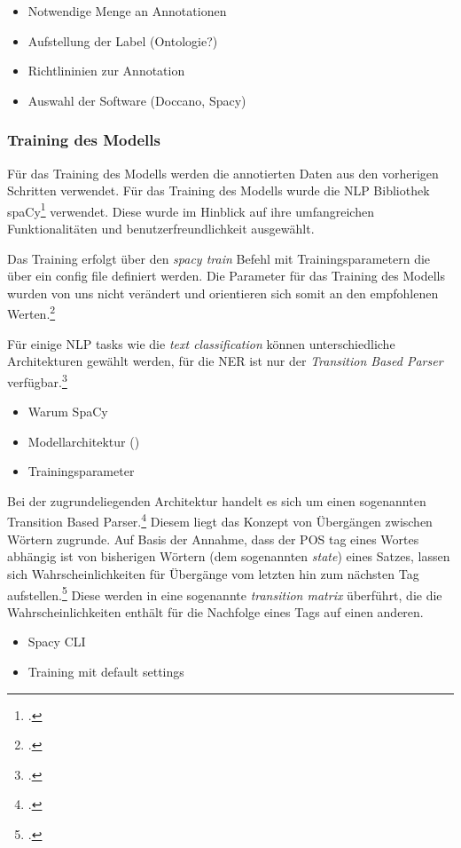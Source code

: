 
\begin{itemize}
    \item Notwendige Menge an Annotationen
    \item Aufstellung der Label (Ontologie?)
    \item Richtlininien zur Annotation
    \item Auswahl der Software (Doccano, Spacy)
\end{itemize}
\subsubsection{Training des Modells}
Für das Training des Modells werden die annotierten Daten aus den vorherigen Schritten verwendet.
Für das Training des Modells wurde die \acl{NLP} Bibliothek spaCy\footcite[]{spacy2} verwendet. Diese wurde im Hinblick auf ihre umfangreichen Funktionalitäten und benutzerfreundlichkeit ausgewählt.

Das Training erfolgt über den \textit{spacy train} Befehl mit Trainingsparametern die über ein config file definiert werden. Die Parameter für das Training des Modells wurden von uns nicht verändert und orientieren sich somit an den empfohlenen Werten.\footcite[vgl.]{ostkamp2021}%

Für einige \ac{NLP} tasks wie die \textit{text classification} können unterschiedliche Architekturen gewählt werden, für die \acl*{NER} ist nur der \textit{Transition Based Parser} verfügbar.\footcite{zotero-182}

\begin{itemize}
    \item Warum SpaCy
    \item Modellarchitektur ()
    \item Trainingsparameter
\end{itemize}


Bei der zugrundeliegenden Architektur handelt es sich um einen sogenannten Transition Based Parser.\footcite{zotero-182} Diesem liegt das Konzept von Übergängen zwischen Wörtern zugrunde. Auf Basis der Annahme, dass der \acl*{POS} tag eines Wortes abhängig ist von bisherigen Wörtern (dem sogenannten \textit{state}) eines Satzes, lassen sich Wahrscheinlichkeiten für Übergänge vom letzten hin zum nächsten Tag aufstellen.\footcite{honnibal2013a} Diese werden in eine sogenannte \textit{transition matrix} überführt, die die Wahrscheinlichkeiten enthält für die Nachfolge eines Tags auf einen anderen.
\begin{itemize}
    \item Spacy CLI
    \item Training mit default settings
\end{itemize}

